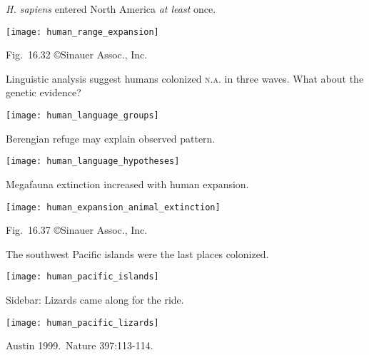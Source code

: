 \documentclass[t]{beamer}
\begin{document}
%
\begin{frame}{\textit{H. sapiens} entered North America \emph{at least} once.}
	\vspace{-\baselineskip}
	\begin{center}
		\texttt{[image: human\_range\_expansion]}
	\end{center}

	\vfilll
	
	\hfill \tiny Fig.~16.32 \copyright Sinauer Assoc., Inc.
\end{frame}
%
\begin{frame}{Linguistic analysis suggest humans colonized \textsc{n.a.} in three waves. What about the genetic evidence?}
	\vspace{-0.5\baselineskip}
	\begin{center}
		\texttt{[image: human\_language\_groups]}
	\end{center}
\end{frame}
%
\begin{frame}[t]{Berengian refuge may explain observed pattern.}
	\vspace{-\baselineskip}
	\begin{center}
		\texttt{[image: human\_language\_hypotheses]}
	\end{center}
\end{frame}
%
\begin{frame}[t]{Megafauna extinction increased with human expansion.}
	\vspace{-\baselineskip}
	\begin{center}
		\texttt{[image: human\_expansion\_animal\_extinction]}
	\end{center}

	\vfilll
	
	\hfill \tiny Fig.~16.37 \copyright Sinauer Assoc., Inc.
	
\end{frame}
%
\begin{frame}{The southwest Pacific islands were the last places colonized.}
	\vspace{-\baselineskip}
	\begin{center}
		\texttt{[image: human\_pacific\_islands]}
	\end{center}
\end{frame}
%
\begin{frame}{Sidebar: Lizards came along for the ride.}
	\vspace{-\baselineskip}
	\begin{center}
		\texttt{[image: human\_pacific\_lizards]}
	\end{center}

	\hfill \tiny Austin 1999.~Nature 397:113-114.
\end{frame}
\end{document}
